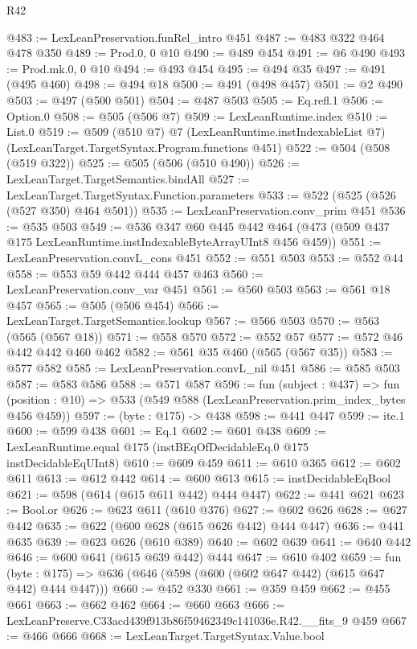 \begin{lexlean}{R42}
\begin{coremodule}
@483 := LexLeanPreservation.funRel_intro @451
@487 := @483 @322 @464 @478 @350
@489 := Prod.{0, 0} @10
@490 := @489 @454
@491 := @6 @490
@493 := Prod.mk.{0, 0} @10
@494 := @493 @454
@495 := @494 @35
@497 := @491 (@495 @460)
@498 := @494 @18
@500 := @491 (@498 @457)
@501 := @2 @490
@503 := @497 (@500 @501)
@504 := @487 @503
@505 := Eq.refl.{1}
@506 := Option.{0}
@508 := @505 (@506 @7)
@509 := LexLeanRuntime.index
@510 := List.{0}
@519 := @509
    (@510 @7)
    @7
    (LexLeanRuntime.instIndexableList @7)
    (LexLeanTarget.TargetSyntax.Program.functions @451)
@522 := @504 (@508 (@519 @322))
@525 := @505 (@506 (@510 @490))
@526 := LexLeanTarget.TargetSemantics.bindAll
@527 := LexLeanTarget.TargetSyntax.Function.parameters
@533 := @522 (@525 (@526 (@527 @350) @464 @501))
@535 := LexLeanPreservation.conv_prim @451
@536 := @535 @503
@549 := @536
    @347
    @60
    @445
    @442
    @464
    (@473 (@509 @437 @175 LexLeanRuntime.instIndexableByteArrayUInt8 @456 @459))
@551 := LexLeanPreservation.convL_cons @451
@552 := @551 @503
@553 := @552 @44
@558 := @553 @59 @442 @444 @457 @463
@560 := LexLeanPreservation.conv_var @451
@561 := @560 @503
@563 := @561 @18 @457
@565 := @505 (@506 @454)
@566 := LexLeanTarget.TargetSemantics.lookup
@567 := @566 @503
@570 := @563 (@565 (@567 @18))
@571 := @558 @570
@572 := @552 @57
@577 := @572 @46 @442 @442 @460 @462
@582 := @561 @35 @460 (@565 (@567 @35))
@583 := @577 @582
@585 := LexLeanPreservation.convL_nil @451
@586 := @585 @503
@587 := @583 @586
@588 := @571 @587
@596 := fun (subject : @437) =>
  fun (position : @10) => @533 (@549 @588 (LexLeanPreservation.prim_index_bytes @456 @459))
@597 := (byte : @175) -> @438
@598 := @441 @447
@599 := ite.{1}
@600 := @599 @438
@601 := Eq.{1}
@602 := @601 @438
@609 := LexLeanRuntime.equal @175 (instBEqOfDecidableEq.{0} @175 instDecidableEqUInt8)
@610 := @609 @459
@611 := @610 @365
@612 := @602 @611
@613 := @612 @442
@614 := @600 @613
@615 := instDecidableEqBool
@621 := @598 (@614 (@615 @611 @442) @444 @447)
@622 := @441 @621
@623 := Bool.or
@626 := @623 @611 (@610 @376)
@627 := @602 @626
@628 := @627 @442
@635 := @622 (@600 @628 (@615 @626 @442) @444 @447)
@636 := @441 @635
@639 := @623 @626 (@610 @389)
@640 := @602 @639
@641 := @640 @442
@646 := @600 @641 (@615 @639 @442) @444
@647 := @610 @402
@659 := fun (byte : @175) => @636 (@646 (@598 (@600 (@602 @647 @442) (@615 @647 @442) @444 @447)))
@660 := @452 @330
@661 := @359 @459
@662 := @455 @661
@663 := @662 @462
@664 := @660 @663
@666 := LexLeanPreserve.C33acd439f913b86f59462349c141036e.R42.__fits_9 @459
@667 := @466 @666
@668 := LexLeanTarget.TargetSyntax.Value.bool

\end{coremodule}
\end{lexlean}

